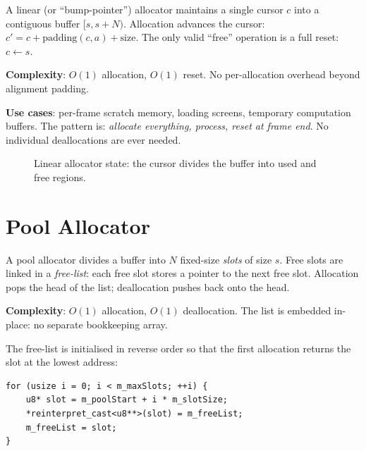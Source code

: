 \begin{definition}
A linear (or ``bump-pointer'') allocator maintains a single cursor
$c$ into a contiguous buffer $[s, s+N)$. Allocation advances the cursor:
$c' = c + \text{padding}(c, a) + \text{size}$.
The only valid ``free'' operation is a full reset: $c \gets s$.
\end{definition}

\textbf{Complexity}: $O(1)$ allocation, $O(1)$ reset. No per-allocation
overhead beyond alignment padding.

\textbf{Use cases}: per-frame scratch memory, loading screens, temporary
computation buffers. The pattern is: \emph{allocate everything, process,
reset at frame end}. No individual deallocations are ever needed.

\begin{figure}[H]
\centering
{}
\caption{Linear allocator state: the cursor divides the buffer into used and free regions.}
\end{figure}

\section{Pool Allocator}

\begin{definition}
A pool allocator divides a buffer into $N$ fixed-size \emph{slots} of
size $s$. Free slots are linked in a \emph{free-list}: each free slot
stores a pointer to the next free slot. Allocation pops the head of the
list; deallocation pushes back onto the head.
\end{definition}

\textbf{Complexity}: $O(1)$ allocation, $O(1)$ deallocation.
The list is embedded in-place: no separate bookkeeping array.

The free-list is initialised in reverse order so that the first
allocation returns the slot at the lowest address:

\begin{lstlisting}[caption={Free-list initialisation (reversed)}]
for (usize i = 0; i < m_maxSlots; ++i) {
    u8* slot = m_poolStart + i * m_slotSize;
    *reinterpret_cast<u8**>(slot) = m_freeList;
    m_freeList = slot;
}
\end{lstlisting}

